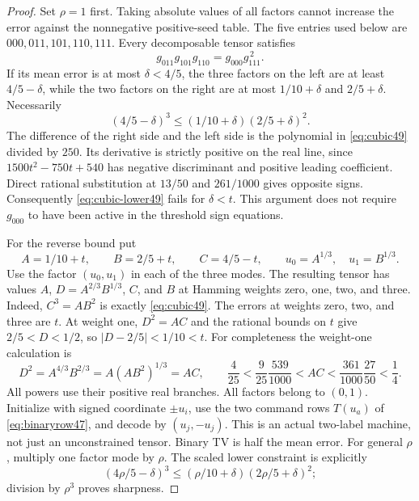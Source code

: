 \begin{proof}
Set $\rho=1$ first. Taking absolute values of all factors cannot
increase the error against the nonnegative positive-seed table.
The five entries used below are $000,011,101,110,111$. Every decomposable tensor satisfies
\begin{equation}\label{eq:cubic-circuit49}
 g_{011}g_{101}g_{110}=g_{000}g_{111}^{\,2}.
\end{equation}
If its mean error is at most $\delta<4/5$, the three factors on the
left are at least $4/5-\delta$, while the two factors on the right
are at most $1/10+\delta$ and $2/5+\delta$. Necessarily
\begin{equation}\label{eq:cubic-lower49}
 (4/5-\delta)^3\le(1/10+\delta)(2/5+\delta)^2.
\end{equation}
The difference of the right side and the left side is the polynomial
in \eqref{eq:cubic49} divided by $250$. Its derivative is strictly
positive on the real line, since $1500t^2-750t+540$ has negative
discriminant and positive leading coefficient. Direct rational
substitution at $13/50$ and $261/1000$ gives opposite signs.
Consequently \eqref{eq:cubic-lower49} fails for $\delta<t$.
This argument does not require $g_{000}$ to have been active in the
threshold sign equations.

For the reverse bound put
\[
 A=1/10+t,\qquad B=2/5+t,\qquad C=4/5-t,\qquad
 u_0=A^{1/3},\quad u_1=B^{1/3}.
\]
Use the factor $(u_0,u_1)$ in each of the three modes. The resulting
tensor has values $A$, $D=A^{2/3}B^{1/3}$, $C$, and $B$ at Hamming
weights zero, one, two, and three. Indeed, $C^3=AB^2$ is exactly
\eqref{eq:cubic49}. The errors at weights zero, two, and three are
$t$. At weight one, $D^2=AC$ and the rational bounds on $t$ give
$2/5<D<1/2$, so $|D-2/5|<1/10<t$.
For completeness the weight-one calculation is
\[
 D^2=A^{4/3}B^{2/3}=A(AB^2)^{1/3}=AC,
 \qquad \frac4{25}<\frac9{25}\frac{539}{1000}<AC
 <\frac{361}{1000}\frac{27}{50}<\frac14.
\]
All powers use their positive real branches. All factors belong to $(0,1)$.
Initialize with signed coordinate $\pm u_i$, use the two command
rows $T(u_a)$ of \eqref{eq:binaryrow47}, and decode by
$(u_j,-u_j)$. This is an actual two-label machine, not just an
unconstrained tensor. Binary TV is half the mean error.
For general $\rho$, multiply one factor mode by $\rho$.
The scaled lower constraint is explicitly
\[
 (4\rho/5-\delta)^3\le(\rho/10+\delta)(2\rho/5+\delta)^2;
\]
division by $\rho^3$ proves sharpness.


\end{proof}
